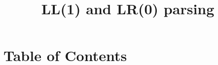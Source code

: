 \documentclass{article}
\title{LL(1) and LR(0) parsing}
\begin{document}
\maketitle
\section{Table of Contents}
\end{document}
